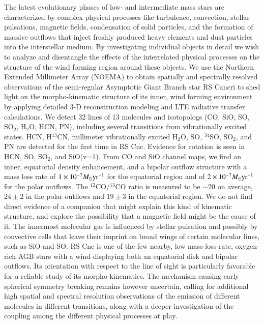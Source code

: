 \documentclass{aa}
\begin{document}
  \abstract
  {The latest evolutionary phases of low- and intermediate mass stars
    are characterized by complex physical processes like turbulence,
    convection, stellar pulsations, magnetic fields, condensation of
    solid particles, and the formation of massive outflows that inject
    freshly produced heavy elements and dust particles into the
    interstellar medium.} 
  {By investigating individual objects in detail we wish to analyze and
    disentangle the effects of the interrelated physical processes on
    the structure of the wind forming region around these objects.}
  {We use the Northern Extended Millimeter Array (NOEMA) to obtain spatially
    and spectrally resolved observations of the semi-regular
    Asymptotic Giant Branch star RS Cancri to shed light on the
    morpho-kinematic structure of its inner, wind forming
    environment by applying detailed 3-D reconstruction modeling and LTE
    radiative transfer calculations.}
  {We detect 32 lines of 13 molecules and isotopologs (CO, SiO, SO,
   SO$_2$,  H$_2$O, HCN, PN), including several transitions from
   vibrationally excited states.  HCN, H$^{13}$CN, millimeter
   vibrationally excited H$_2$O, SO, $^{34}$SO, SO$_2$, and PN are
   detected for the first time in RS Cnc.  Evidence for rotation is seen
   in HCN, SO, SO$_2$, and SiO(v=1). From CO and SiO channel maps, we
   find an inner, equatorial density enhancement, and a bipolar outflow
   structure with a mass  loss rate of $1 \times 10^{-7}M_\odot{\rm
   yr}^{-1}$ for the equatorial region  and of $2 \times
   10^{-7}M_\odot{\rm yr}^{-1}$ for the polar outflows.  The
   $^{12}$CO/$^{13}$CO ratio is measured to be $\sim20$ on average,
   $24\pm2$ in the polar outflows and $19\pm3$ in the equatorial region.
   We do not find direct evidence of a companion that might explain this
   kind of kinematic structure, and explore the possibility that a
   magnetic field might be the cause of it. The innermost molecular gas
   is influenced by stellar pulsation and possibly by convective cells
   that leave their imprint on broad wings of certain molecular lines,
   such as SiO and SO.}
  {RS Cnc is one of the few nearby, low
   mass-loss-rate, oxygen-rich AGB stars with a wind displaying both an
   equatorial disk and bipolar outflows. Its orientation with respect to
   the line of sight is particularly favorable for a reliable study of
   its morpho-kinematics. The mechanism causing early spherical symmetry
   breaking remains however uncertain, calling for additional high
   spatial and spectral resolution observations of the emission of
   different molecules in different transitions, along with a deeper 
   investigation of the coupling among the different physical processes at
   play.}
\end{document}
